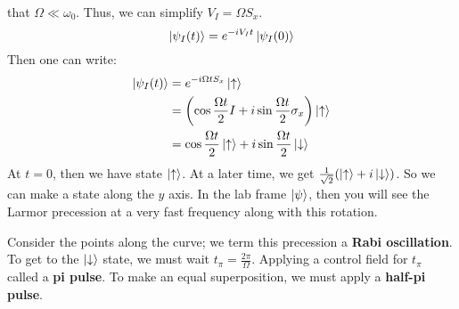 that $\Omega \ll \omega_0$.
Thus, we can simplify $V_I = \Omega S_x$. 
\[ \ket{\psi_I(t)} = e^{-iV_I t} \ket{\psi_I(0)} \]
Then one can write:
\begin{align*}
    \ket{\psi_I(t)} &= e^{-i\Omega t S_x} \ket{\uparrow} \\
    &= \qty(\cos \frac{\Omega t}{2} I + i \sin \frac{\Omega t}{2} \sigma_x) \ket{\uparrow} \\
    &= \cos \frac{\Omega t}{2} \ket{\uparrow} + i \sin \frac{\Omega t}{2} \ket{\downarrow}
\end{align*}
At $t = 0$, then we have state $\ket{\uparrow}$. At a later time, we get $\frac{1}{\sqrt{2}}\qty(\ket{\uparrow} + i \ket{\downarrow})$.
So we can make a state along the $y$ axis. In the lab frame $\ket{\psi}$, then you will see the Larmor precession at a very fast frequency
along with this rotation.

Consider the points along the curve; we term this precession a \textbf{Rabi oscillation}. To get to the $\ket{\downarrow}$ state, we must wait $t_{\pi} = \frac{2\pi}{\Omega}$.
Applying a control field for $t_{\pi}$ called a \textbf{pi pulse}. To make an equal superposition, we must apply a \textbf{half-pi pulse}.
